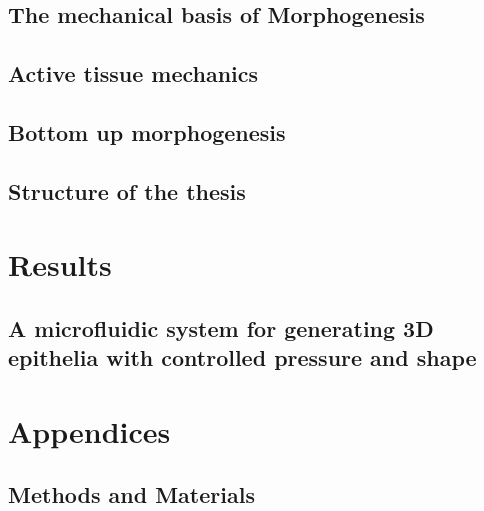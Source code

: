 \documentclass[11pt, final, a4paper, twoside, openright]{book}
\begin{document}
	\renewcommand{\thesection}{2.\arabic{section}}
	\hypertarget{the-mechanical-basis-of-morphogenesis}{%
	\chapter{The mechanical basis of
	Morphogenesis}\label{the-mechanical-basis-of-morphogenesis}}
	
	
	\renewcommand{\thesection}{3.\arabic{section}}
	\hypertarget{active-tissue-mechanics}{%
	\chapter{Active tissue mechanics}\label{active-tissue-mechanics}}
	

	\renewcommand{\thesection}{4.\arabic{section}}
	\hypertarget{bottom-up-morphogenesis}{%
	\chapter{Bottom up morphogenesis}\label{bottom-up-morphogenesis}}
	
	
	\renewcommand{\thesection}{5.\arabic{section}}
	\hypertarget{structure-of-the-thesis}{%
	\chapter{Structure of the thesis}\label{structure-of-the-thesis}}
	
	
	\part{Results}
	\renewcommand{\thesection}{6.\arabic{section}}
	\hypertarget{a-microfluidic-system-for-generating-3d-epithelia-with-controlled-pressure-and-shape}{%
	\chapter{A microfluidic system for generating 3D epithelia with controlled pressure and 		shape}\label{a-microfluidic-system-for-generating-3d-epithelia-with-controlled-pressure-and-shape}}
	
	
	\part{Appendices}
	\begin{appendices}
		\renewcommand{\thesection}{A.\arabic{section}}
		\chapter{Methods and Materials}   \label{appendix_1}
		
	\end{appendices}
	
	\backmatter
	
	
\end{document}
